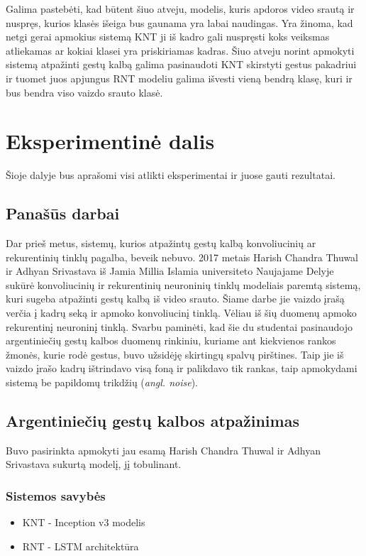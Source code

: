 \documentclass{VUMIFPSbakalaurinis}
\begin{document}
Galima pastebėti, kad būtent šiuo atveju, modelis, kuris apdoros video srautą ir nuspręs, kurios klasės išeiga bus gaunama yra labai naudingas. Yra žinoma, kad netgi gerai apmokius sistemą KNT ji iš kadro gali nuspręsti koks veiksmas atliekamas ar kokiai klasei yra priskiriamas kadras. Šiuo atveju norint apmokyti sistemą atpažinti gestų kalbą galima pasinaudoti KNT skirstyti gestus pakadriui ir tuomet juos apjungus RNT modeliu galima išvesti vieną bendrą klasę, kuri ir bus bendra viso vaizdo srauto klasė.

\section{Eksperimentinė dalis}

Šioje dalyje bus aprašomi visi atlikti eksperimentai ir juose gauti rezultatai.

\subsection{Panašūs darbai}
Dar prieš metus, sistemų, kurios atpažintų gestų kalbą konvoliucinių ar rekurentinių tinklų pagalba, beveik nebuvo. 2017 metais Harish Chandra Thuwal ir Adhyan Srivastava iš Jamia Millia Islamia universiteto Naujajame Delyje sukūrė konvoliucinių ir rekurentinių neuroninių tinklų modeliais paremtą sistemą, kuri sugeba atpažinti gestų kalbą iš video srauto. Šiame darbe jie vaizdo įrašą verčia į kadrų seką ir apmoko konvoliucinį tinklą. Vėliau iš šių duomenų apmoko rekurentinį neuroninį tinklą. Svarbu paminėti, kad šie du studentai pasinaudojo argentiniečių gestų kalbos duomenų rinkiniu, kuriame ant kiekvienos rankos žmonės, kurie rodė gestus, buvo užsidėję skirtingų spalvų pirštines. Taip jie iš vaizdo įrašo kadrų ištrindavo visą foną ir palikdavo tik rankas, taip apmokydami sistemą be papildomų trikdžių (\textit{angl. noise}).

\subsection{Argentiniečių gestų kalbos atpažinimas}

Buvo pasirinkta apmokyti jau esamą Harish Chandra Thuwal ir Adhyan Srivastava sukurtą modelį, jį tobulinant.

\subsubsection{Sistemos savybės}
\begin{itemize}
	\item KNT - Inception v3 modelis
	\item RNT - LSTM architektūra
\end{itemize}
\end{document}
